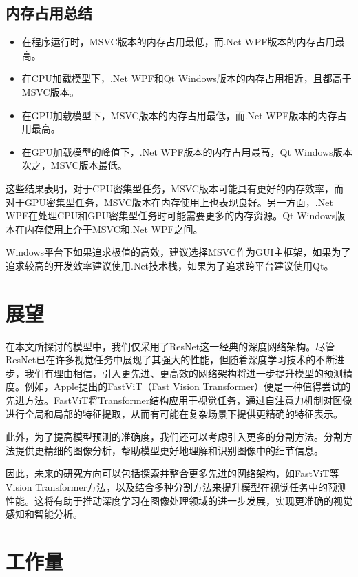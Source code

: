 \subsection{内存占用总结}

\begin{itemize}
	\item 在程序运行时，MSVC版本的内存占用最低，而.Net WPF版本的内存占用最高。
	\item 在CPU加载模型下，.Net WPF和Qt Windows版本的内存占用相近，且都高于MSVC版本。
	\item 在GPU加载模型下，MSVC版本的内存占用最低，而.Net WPF版本的内存占用最高。
	\item 在GPU加载模型的峰值下，.Net WPF版本的内存占用最高，Qt Windows版本次之，MSVC版本最低。
\end{itemize}

这些结果表明，对于CPU密集型任务，MSVC版本可能具有更好的内存效率，而对于GPU密集型任务，MSVC版本在内存使用上也表现良好。另一方面，.Net WPF在处理CPU和GPU密集型任务时可能需要更多的内存资源。Qt Windows版本在内存使用上介于MSVC和.Net WPF之间。

Windows平台下如果追求极值的高效，建议选择MSVC作为GUI主框架，如果为了追求较高的开发效率建议使用.Net技术栈，如果为了追求跨平台建议使用Qt。

\section{展望}

在本文所探讨的模型中，我们仅采用了ResNet这一经典的深度网络架构。尽管ResNet已在许多视觉任务中展现了其强大的性能，但随着深度学习技术的不断进步，我们有理由相信，引入更先进、更高效的网络架构将进一步提升模型的预测精度。例如，Apple提出的FastViT（Fast Vision Transformer）\cite{Vasu_Gabriel_Zhu_Tuzel_Ranjan_2023}便是一种值得尝试的先进方法。FastViT将Transformer结构应用于视觉任务，通过自注意力机制对图像进行全局和局部的特征提取，从而有可能在复杂场景下提供更精确的特征表示。

此外，为了提高模型预测的准确度，我们还可以考虑引入更多的分割方法。分割方法提供更精细的图像分析，帮助模型更好地理解和识别图像中的细节信息。

因此，未来的研究方向可以包括探索并整合更多先进的网络架构，如FastViT等Vision Transformer方法，以及结合多种分割方法来提升模型在视觉任务中的预测性能。这将有助于推动深度学习在图像处理领域的进一步发展，实现更准确的视觉感知和智能分析。

\section{工作量}


